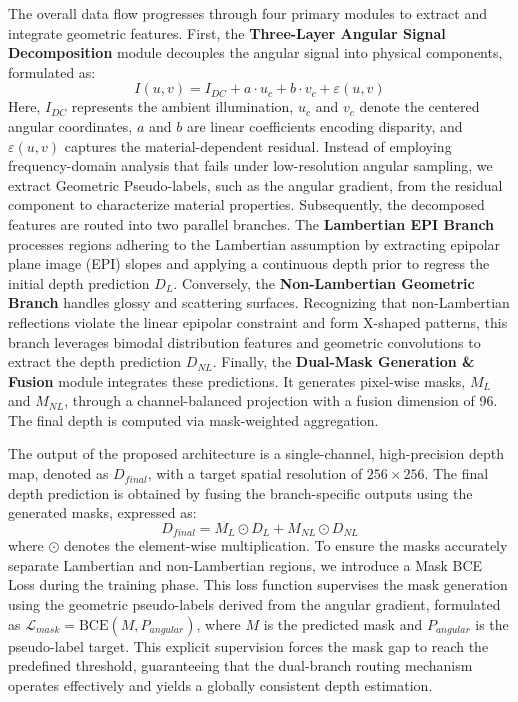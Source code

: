 The overall data flow progresses through four primary modules to extract and integrate geometric features. First, the \textbf{Three-Layer Angular Signal Decomposition} module decouples the angular signal into physical components, formulated as:
\begin{equation}
\label{eq:eq7}
I(u,v) = I_{DC} + a \cdot u_c + b \cdot v_c + \varepsilon(u,v)
\end{equation}
Here, $I_{DC}$ represents the ambient illumination, $u_c$ and $v_c$ denote the centered angular coordinates, $a$ and $b$ are linear coefficients encoding disparity, and $\varepsilon(u,v)$ captures the material-dependent residual. Instead of employing frequency-domain analysis that fails under low-resolution angular sampling, we extract Geometric Pseudo-labels, such as the angular gradient, from the residual component to characterize material properties. Subsequently, the decomposed features are routed into two parallel branches. The \textbf{Lambertian EPI Branch} processes regions adhering to the Lambertian assumption by extracting epipolar plane image (EPI) slopes  and applying a continuous depth prior to regress the initial depth prediction $D_L$. Conversely, the \textbf{Non-Lambertian Geometric Branch} handles glossy and scattering surfaces. Recognizing that non-Lambertian reflections violate the linear epipolar constraint and form X-shaped patterns, this branch leverages bimodal distribution features and geometric convolutions to extract the depth prediction $D_{NL}$. Finally, the \textbf{Dual-Mask Generation & Fusion} module integrates these predictions. It generates pixel-wise masks, $M_L$ and $M_{NL}$, through a channel-balanced projection with a fusion dimension of 96. The final depth is computed via mask-weighted aggregation.

The output of the proposed architecture is a single-channel, high-precision depth map, denoted as $D_{final}$, with a target spatial resolution of $256 \times 256$. The final depth prediction is obtained by fusing the branch-specific outputs using the generated masks, expressed as:
\begin{equation}
\label{eq:eq8}
D_{final} = M_L \odot D_L + M_{NL} \odot D_{NL}
\end{equation}
where $\odot$ denotes the element-wise multiplication. To ensure the masks accurately separate Lambertian and non-Lambertian regions, we introduce a Mask BCE Loss during the training phase. This loss function supervises the mask generation using the geometric pseudo-labels derived from the angular gradient, formulated as $\mathcal{L}_{mask} = \text{BCE}(M, P_{angular})$, where $M$ is the predicted mask and $P_{angular}$ is the pseudo-label target. This explicit supervision forces the mask gap to reach the predefined threshold, guaranteeing that the dual-branch routing mechanism operates effectively and yields a globally consistent depth estimation.

